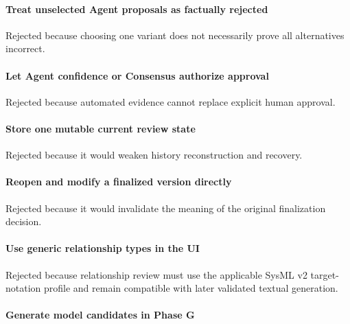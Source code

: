 \hypertarget{treat-unselected-agent-proposals-as-factually-rejected}{%
\paragraph{Treat unselected Agent proposals as factually rejected}\label{treat-unselected-agent-proposals-as-factually-rejected}}

Rejected because choosing one variant does not necessarily prove all alternatives incorrect.

\hypertarget{let-agent-confidence-or-consensus-authorize-approval}{%
\paragraph{Let Agent confidence or Consensus authorize approval}\label{let-agent-confidence-or-consensus-authorize-approval}}

Rejected because automated evidence cannot replace explicit human approval.

\hypertarget{store-one-mutable-current-review-state}{%
\paragraph{Store one mutable current review state}\label{store-one-mutable-current-review-state}}

Rejected because it would weaken history reconstruction and recovery.

\hypertarget{reopen-and-modify-a-finalized-version-directly}{%
\paragraph{Reopen and modify a finalized version directly}\label{reopen-and-modify-a-finalized-version-directly}}

Rejected because it would invalidate the meaning of the original finalization decision.

\hypertarget{use-generic-relationship-types-in-the-ui}{%
\paragraph{Use generic relationship types in the UI}\label{use-generic-relationship-types-in-the-ui}}

Rejected because relationship review must use the applicable SysML v2 target-notation profile and remain compatible with later validated textual generation.

\hypertarget{generate-model-candidates-in-phase-g}{%
\paragraph{Generate model candidates in Phase G}\label{generate-model-candidates-in-phase-g}}

